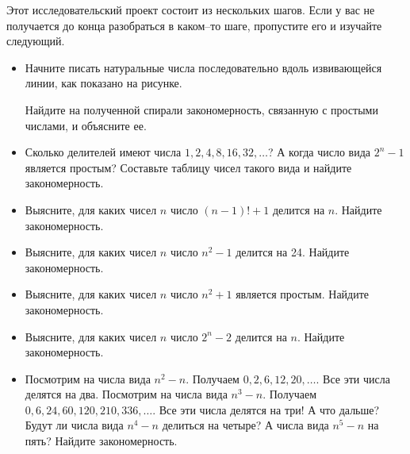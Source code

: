 ﻿

Этот исследовательский проект состоит из нескольких шагов. Если у вас не получается до конца разобраться в каком--то шаге, пропустите его и изучайте следующий. 
\begin{itemize}
\item Начните писать натуральные числа последовательно вдоль извивающейся линии, как показано на рисунке.

\begin{center}  \end{center}

Найдите на полученной спирали закономерность, связанную с простыми числами, и объясните ее.
\item Сколько делителей имеют числа $1, 2, 4, 8, 16, 32, \ldots$? А когда число вида $2^n - 1$ является простым? Составьте таблицу чисел такого вида и найдите закономерность.
\item Выясните, для каких чисел $n$ число $(n-1)!+1$ делится на $n$. Найдите закономерность.
\item Выясните, для каких чисел $n$ число $n^2-1$ делится на 24. Найдите закономерность. 
\item Выясните, для каких чисел $n$ число $n^2+1$ является простым. Найдите закономерность. 
\item Выясните, для каких чисел $n$ число $2^n-2$ делится на $n$. Найдите закономерность.
\item Посмотрим на числа вида $n^2-n$. Получаем $0,2,6,12,20,\ldots$. Все эти числа делятся на два. Посмотрим на числа вида $n^3-n$. Получаем $0, 6, 24, 60, 120, 210, 336, \ldots$. Все эти числа делятся на три! А что дальше? Будут ли числа вида $n^4-n$ делиться на четыре? А числа вида $n^5-n$ на пять? Найдите закономерность.
\end{itemize}